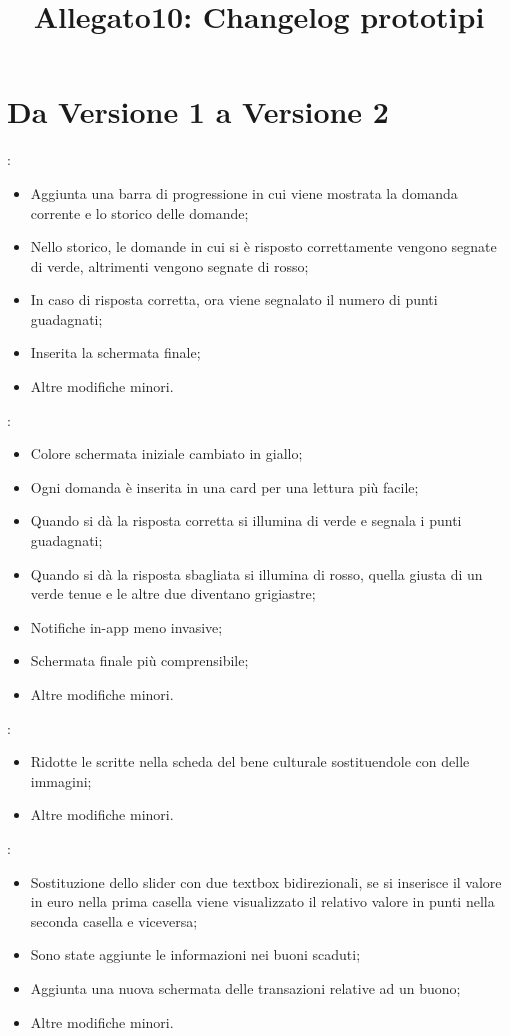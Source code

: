 \documentclass{article}
\title{\textbf{Allegato10: Changelog prototipi}}
\date{}
\begin{document}
\maketitle

\section{Da Versione 1 a Versione 2}
\begin{description}
\addtolength{\itemindent}{0.5cm}
\item [Quiz Giornaliero] :
	\begin{itemize}
	\item Aggiunta una barra di progressione in cui viene mostrata la domanda corrente e lo storico delle domande;
	\item Nello storico, le domande in cui si è risposto correttamente vengono segnate di verde, altrimenti vengono segnate di rosso;
	\item In caso di risposta corretta, ora viene segnalato il numero di punti guadagnati;
	\item Inserita la schermata finale;
	\item Altre modifiche minori.
	\end{itemize}
\item [Quiz Settimanale] :
	\begin{itemize}
	\item Colore schermata iniziale cambiato in giallo;
	\item Ogni domanda è inserita in una card per una lettura più facile;
	\item Quando si dà la risposta corretta si illumina di verde e segnala i punti guadagnati;
	\item Quando si dà la risposta sbagliata si illumina di rosso, quella giusta di un verde tenue e le altre due diventano grigiastre;
	\item Notifiche in-app meno invasive;
	\item Schermata finale più comprensibile;
	\item Altre modifiche minori.
	\end{itemize}
\item [Bacheca] :
    \begin{itemize}
	\item Ridotte le scritte nella scheda del bene culturale sostituendole con delle immagini;
	\item Altre modifiche minori.
	\end{itemize}
\item [Shop] :
    \begin{itemize}
	\item Sostituzione dello slider con due textbox bidirezionali, se si inserisce il valore in euro nella prima casella viene visualizzato il relativo valore in punti nella seconda casella e viceversa;
	\item Sono state aggiunte le informazioni nei buoni scaduti;
	\item Aggiunta una nuova schermata delle transazioni relative ad un buono;
	\item Altre modifiche minori.
	\end{itemize}
\end{description}
\end{document}
